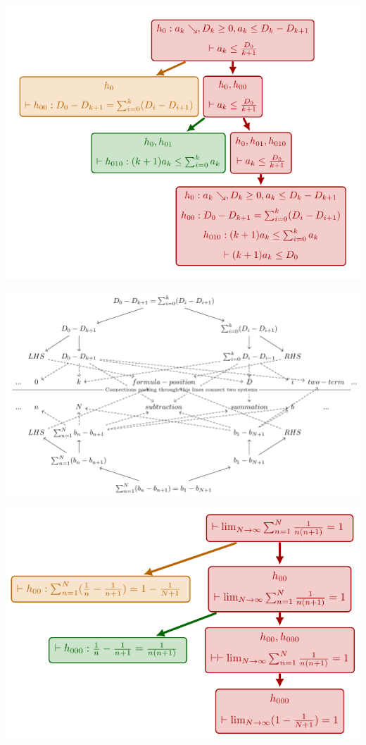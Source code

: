 \documentclass[border=14pt,tikz,dvipsnames]{article}
\begin{document}
\includegraphics[scale=0.75]{telescope1.pdf}

\includegraphics[scale=0.5]{knowledge_sys.pdf}

\includegraphics[scale=0.75]{telescope2.pdf}


%
%
%
\end{document}
